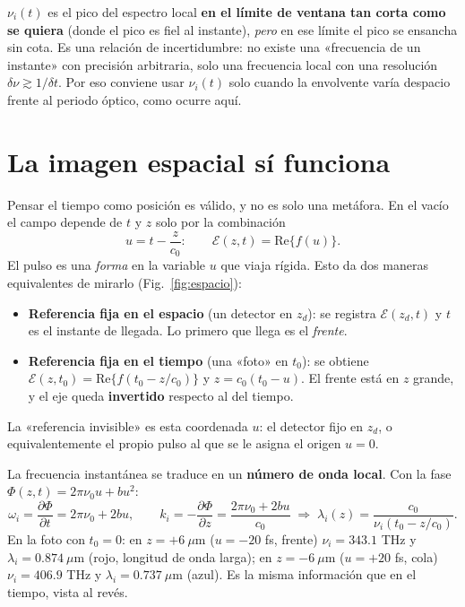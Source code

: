 \documentclass[11pt]{article}
\begin{document}
\begin{clave}[title={Qué es $\nu_i(t)$ en este lenguaje}]
$\nu_i(t)$ es el pico del espectro local \textbf{en el límite de ventana tan corta como se quiera} (donde el pico es fiel al instante), \emph{pero} en ese límite el pico se ensancha sin cota. Es una relación de incertidumbre: no existe una «frecuencia de un instante» con precisión arbitraria, solo una frecuencia local con una resolución $\delta\nu\gtrsim1/\delta t$. Por eso conviene usar $\nu_i(t)$ solo cuando la envolvente varía despacio frente al periodo óptico, como ocurre aquí.
\end{clave}

\section{La imagen espacial sí funciona}
Pensar el tiempo como posición es válido, y no es solo una metáfora. En el vacío el campo depende de $t$ y $z$ solo por la combinación
\[
u=t-\frac{z}{c_0}:\qquad \mathcal E(z,t)=\mathrm{Re}\{f(u)\}.
\]
El pulso es una \emph{forma} en la variable $u$ que viaja rígida. Esto da dos maneras equivalentes de mirarlo (Fig.~\ref{fig:espacio}):

\begin{itemize}
\item \textbf{Referencia fija en el espacio} (un detector en $z_d$): se registra $\mathcal E(z_d,t)$ y $t$ es el instante de llegada. Lo primero que llega es el \emph{frente}.
\item \textbf{Referencia fija en el tiempo} (una «foto» en $t_0$): se obtiene $\mathcal E(z,t_0)=\mathrm{Re}\{f(t_0-z/c_0)\}$ y $z=c_0(t_0-u)$. El frente está en $z$ grande, y el eje queda \textbf{invertido} respecto al del tiempo.
\end{itemize}
La «referencia invisible» es esta coordenada $u$: el detector fijo en $z_d$, o equivalentemente el propio pulso al que se le asigna el origen $u=0$.

La frecuencia instantánea se traduce en un \textbf{número de onda local}. Con la fase $\Phi(z,t)=2\pi\nu_0u+bu^2$:
\[
\omega_i=\frac{\partial\Phi}{\partial t}=2\pi\nu_0+2bu,\qquad
k_i=-\frac{\partial\Phi}{\partial z}=\frac{2\pi\nu_0+2bu}{c_0}\;\Rightarrow\;\lambda_i(z)=\frac{c_0}{\nu_i(t_0-z/c_0)} .
\]
En la foto con $t_0=0$: en $z=+6\ \mu$m ($u=-20$ fs, frente) $\nu_i=343.1$ THz y $\lambda_i=0.874\ \mu$m (rojo, longitud de onda larga); en $z=-6\ \mu$m ($u=+20$ fs, cola) $\nu_i=406.9$ THz y $\lambda_i=0.737\ \mu$m (azul). Es la misma información que en el tiempo, vista al revés.
\end{document}
